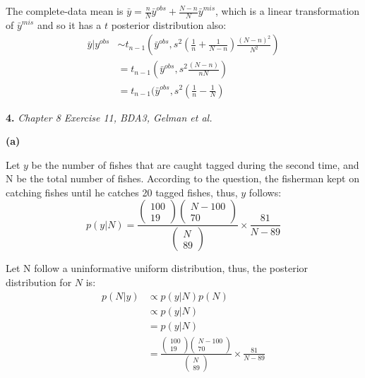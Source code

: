 \documentclass[letterpaper,11pt]{article}
\begin{document}
The complete-data mean is $\bar{y} = \frac{n}{N}\bar{y}^{obs} + \frac{N-n}{N}\bar{y}^{mis}$, which is a linear transformation of $\bar{y}^{mis}$ and so it has a $t$ posterior distribution also:
\begin{align}
\bar{y}\vert y^{obs} &\sim t_{n-1}(\bar{y}^{obs},s^2(\frac{1}{n}+\frac{1}{N-n})\frac{(N-n)^2}{N^2})\nonumber\\
&=t_{n-1}(\bar{y}^{obs},s^2\frac{(N-n)}{nN})\nonumber\\
&=t_{n-1}(\bar{y}^{obs},s^2(\frac{1}{n}-\frac{1}{N})\nonumber
\end{align}


\newpage

\begin{addmargin}[-2em]{0em} \large{\textbf{4. }}\large{\textsl{Chapter 8 Exercise 11, BDA3, Gelman et al.}} \end{addmargin}

\begin{addmargin}[-1.1em]{0em} \textbf{(a)}\par \end{addmargin}
Let $y$ be the number of fishes that are caught tagged during the second time, and N be the total number of fishes.
According to the question, the fisherman kept on catching fishes until he catches 20 tagged fishes, thus, $y$ follows:
$$p(y\vert N) = \frac{\begin{pmatrix}
100\\
19
\end{pmatrix}\begin{pmatrix}
N-100\\
70
\end{pmatrix}}{\begin{pmatrix}
N\\
89
\end{pmatrix}}\times\frac{81}{N-89}$$

Let N follow a uninformative uniform distribution, thus, the posterior distribution for $N$ is:
\begin{align}
	p(N\vert y) &\propto p(y\vert N)p(N)\nonumber\\
&\propto p(y\vert N)\nonumber\\
&=p(y\vert N)\nonumber\\
&= \frac{\begin{pmatrix}
100\\
19
\end{pmatrix}\begin{pmatrix}
N-100\\
70
\end{pmatrix}}{\begin{pmatrix}
N\\
89
\end{pmatrix}}\times\frac{81}{N-89}\nonumber
\end{align}
\end{document}
